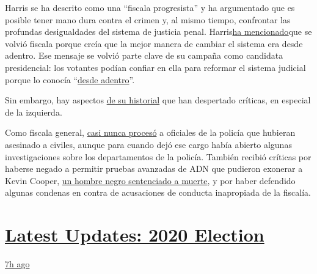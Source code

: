 Harris se ha descrito como una ``fiscala progresista'' y ha argumentado
que es posible tener mano dura contra el crimen y, al mismo tiempo,
confrontar las profundas desigualdades del sistema de justicia penal.
Harris\href{https://www.nytimes3xbfgragh.onion/2020/06/10/us/politics/kamala-harris-racism-police.html}{ha
mencionado}que se volvió fiscala porque creía que la mejor manera de
cambiar el sistema era desde adentro. Ese mensaje se volvió parte clave
de su campaña como candidata presidencial: los votantes podían confiar
en ella para reformar el sistema judicial porque lo conocía
``\href{https://www.nytimes3xbfgragh.onion/2019/09/09/us/politics/kamala-harris-criminal-justice.html}{desde
adentro}''.

Sin embargo, hay aspectos
\href{https://www.nytimes3xbfgragh.onion/2019/02/11/us/kamala-harris-progressive-prosecutor.html}{de
su historial} que han despertado críticas, en especial de la izquierda.

Como fiscala general,
\href{https://www.nytimes3xbfgragh.onion/2020/08/09/us/politics/kamala-harris-policing.html}{casi
nunca procesó} a oficiales de la policía que hubieran asesinado a
civiles, aunque para cuando dejó ese cargo había abierto algunas
investigaciones sobre los departamentos de la policía. También recibió
críticas por haberse negado a permitir pruebas avanzadas de ADN que
pudieron exonerar a Kevin Cooper,
\href{https://www.nytimes3xbfgragh.onion/interactive/2018/05/17/opinion/sunday/kevin-cooper-california-death-row.html}{un
hombre negro sentenciado a muerte}, y por haber defendido algunas
condenas en contra de acusaciones de conducta inapropiada de la
fiscalía.

\hypertarget{latest-updates-2020-election}{%
\section{\texorpdfstring{\href{https://www.nytimes3xbfgragh.onion/live/2020/08/19/us/dnc-convention-election?action=click\&pgtype=Article\&state=default\&region=MAIN_CONTENT_1\&context=storylines_live_updates}{Latest
Updates: 2020
Election}}{Latest Updates: 2020 Election}}\label{latest-updates-2020-election}}

\href{https://www.nytimes3xbfgragh.onion/live/2020/08/19/us/dnc-convention-election?action=click\&pgtype=Article\&state=default\&region=MAIN_CONTENT_1\&context=storylines_live_updates\#night-3-featured-more-policy-a-focus-on-women-and-a-full-throated-rejection-of-trump-by-his-predecessor}{7h
ago}

